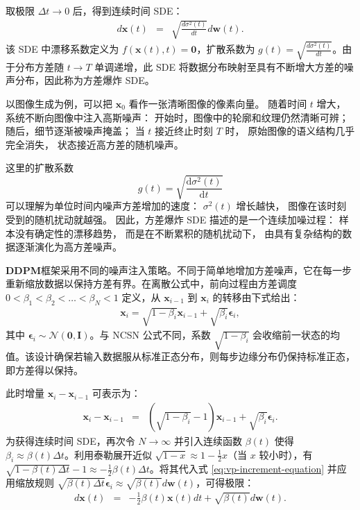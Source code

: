 \documentclass[UTF8,a4paper,zihao=-4,oneside,openany]{ctexbook}
\begin{document}
取极限 $\Delta t \to 0$ 后，得到连续时间 SDE：
\begin{eqnarray}
d\mathbf{x}(t) & = & \sqrt{\frac{d\sigma^2(t)}{dt}} d\mathbf{w}(t).
\label{eq:ve-sde}
\end{eqnarray}
该 SDE 中漂移系数定义为 $f(\mathbf{x}(t), t) = \mathbf{0}$，扩散系数为 $g(t) = \sqrt{\frac{d\sigma^2(t)}{dt}}$。由于分布方差随 $t \to T$ 单调递增，此 SDE 将数据分布映射至具有不断增大方差的噪声分布，因此称为方差爆炸 SDE。

以图像生成为例，可以把
\(\mathbf{x}_0\)
看作一张清晰图像的像素向量。
随着时间 \(t\) 增大，系统不断向图像中注入高斯噪声：
开始时，图像中的轮廓和纹理仍然清晰可辨；
随后，细节逐渐被噪声掩盖；
当 \(t\) 接近终止时刻 \(T\) 时，
原始图像的语义结构几乎完全消失，
状态接近高方差的随机噪声。

这里的扩散系数
\[
    g(t)
    =
    \sqrt{
        \frac{\mathrm{d}\sigma^2(t)}
        {\mathrm{d}t}
    }
\]
可以理解为单位时间内噪声方差增加的速度：
\(\sigma^2(t)\) 增长越快，
图像在该时刻受到的随机扰动就越强。
因此，方差爆炸 SDE 描述的是一个连续加噪过程：
样本没有确定性的漂移趋势，
而是在不断累积的随机扰动下，
由具有复杂结构的数据逐渐演化为高方差噪声。

\textbf{DDPM}框架采用不同的噪声注入策略。不同于简单地增加方差噪声，它在每一步重新缩放数据以保持方差有界。在离散公式中，前向过程由方差调度 $0 < \beta_1 < \beta_2 < \dots < \beta_N < 1$ 定义，从 $\mathbf{x}_{i-1}$ 到 $\mathbf{x}_i$ 的转移由下式给出：
\begin{eqnarray}
\mathbf{x}_i = \sqrt{1 - \beta_i} \mathbf{x}_{i-1} + \sqrt{\beta_i} \boldsymbol{\epsilon}_i,
\end{eqnarray}
其中 $\boldsymbol{\epsilon}_i \sim \mathcal{N}(\mathbf{0}, \mathbf{I})$。与 NCSN 公式不同，系数 $\sqrt{1 - \beta_i}$ 会收缩前一状态的均值。该设计确保若输入数据服从标准正态分布，则每步边缘分布仍保持标准正态，即方差得以保持。

此时增量 $\mathbf{x}_i - \mathbf{x}_{i-1}$ 可表示为：
\begin{eqnarray}
\mathbf{x}_i - \mathbf{x}_{i-1} & = & (\sqrt{1 - \beta_i} - 1) \mathbf{x}_{i-1} + \sqrt{\beta_i} \boldsymbol{\epsilon}_i.
\label{eq:vp-increment-equation}
\end{eqnarray}
为获得连续时间 SDE，再次令 $N \to \infty$ 并引入连续函数 $\beta(t)$ 使得 $\beta_i \approx \beta(t) \Delta t$。利用泰勒展开近似 $\sqrt{1 - x} \approx 1 - \frac{1}{2}x$（当 $x$ 较小时），有 $\sqrt{1 - \beta(t) \Delta t} - 1 \approx -\frac{1}{2}\beta(t) \Delta t$。将其代入式 \eqref{eq:vp-increment-equation} 并应用缩放规则 $\sqrt{\beta(t) \Delta t} \boldsymbol{\epsilon}_i \approx \sqrt{\beta(t)} d\mathbf{w}(t)$，可得极限：
\begin{eqnarray}
d\mathbf{x}(t) & = & -\frac{1}{2} \beta(t) \mathbf{x}(t) d t + \sqrt{\beta(t)} d\mathbf{w}(t).
\label{eq:vp-sde}
\end{eqnarray}
\end{document}
